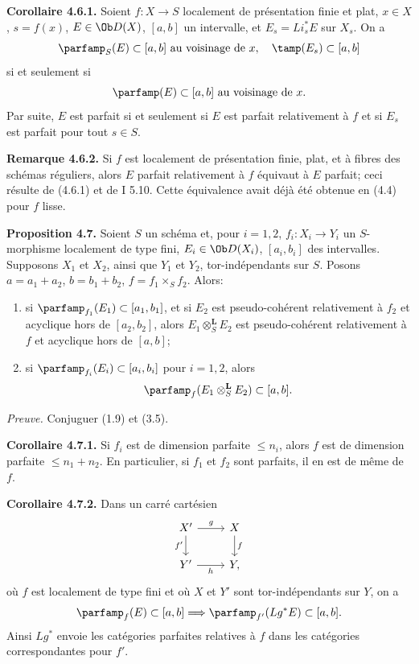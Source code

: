 \documentclass[11pt]{article}
\begin{document}
\textbf{Corollaire 4.6.1.} Soient \(f:X\to S\) localement de présentation finie et plat, \(x\in X\), \(s=f(x)\), \(E\in\Ob D(X)\), \([a,b]\) un intervalle, et \(E_s=Li_s^*E\) sur \(X_s\). On a
\[
 \parfamp_S(E)\subset[a,b]\text{ au voisinage de }x,
 \quad
 \tamp(E_s)\subset[a,b]
\]
si et seulement si
\[
 \parfamp(E)
 \subset[a,b]\text{ au voisinage de }x.
\]
Par suite, \(E\) est parfait si et seulement si \(E\) est parfait relativement à \(f\) et si \(E_s\) est parfait pour tout \(s\in S\).

\textbf{Remarque 4.6.2.} Si \(f\) est localement de présentation finie, plat, et à fibres des schémas réguliers, alors \(E\) parfait relativement à \(f\) équivaut à \(E\) parfait; ceci résulte de (4.6.1) et de I 5.10. Cette équivalence avait déjà été obtenue en (4.4) pour \(f\) lisse.

\textbf{Proposition 4.7.} Soient \(S\) un schéma et, pour \(i=1,2\), \(f_i:X_i\to Y_i\) un \(S\)-morphisme localement de type fini, \(E_i\in\Ob D(X_i)\), \([a_i,b_i]\) des intervalles. Supposons \(X_1\) et \(X_2\), ainsi que \(Y_1\) et \(Y_2\), tor-indépendants sur \(S\). Posons \(a=a_1+a_2\), \(b=b_1+b_2\), \(f=f_1\times_Sf_2\). Alors:
\begin{enumerate}[label=\alph*)]
\item si \(\parfamp_{f_1}(E_1)\subset[a_1,b_1]\), et si \(E_2\) est pseudo-cohérent relativement à \(f_2\) et acyclique hors de \([a_2,b_2]\), alors \(E_1\otimes_S^{\mathbf L}E_2\) est pseudo-cohérent relativement à \(f\) et acyclique hors de \([a,b]\);
\item si \(\parfamp_{f_i}(E_i)\subset[a_i,b_i]\) pour \(i=1,2\), alors
\[
 \parfamp_f(E_1\otimes_S^{\mathbf L}E_2)
 \subset[a,b].
\]
\end{enumerate}

\emph{Preuve.} Conjuguer (1.9) et (3.5).

\textbf{Corollaire 4.7.1.} Si \(f_i\) est de dimension parfaite \(\leq n_i\), alors \(f\) est de dimension parfaite \(\leq n_1+n_2\). En particulier, si \(f_1\) et \(f_2\) sont parfaits, il en est de même de \(f\).

\textbf{Corollaire 4.7.2.} Dans un carré cartésien
\[
\begin{tikzcd}
X' \arrow[r,"g"] \arrow[d,"f'"'] & X \arrow[d,"f"]\\
Y' \arrow[r,"h"'] & Y,
\end{tikzcd}
\]
où \(f\) est localement de type fini et où \(X\) et \(Y'\) sont tor-indépendants sur \(Y\), on a
\[
 \parfamp_f(E)\subset[a,b]
 \Longrightarrow
 \parfamp_{f'}(Lg^*E)\subset[a,b].
\]
Ainsi \(Lg^*\) envoie les catégories parfaites relatives à \(f\) dans les catégories correspondantes pour \(f'\).
\end{document}
